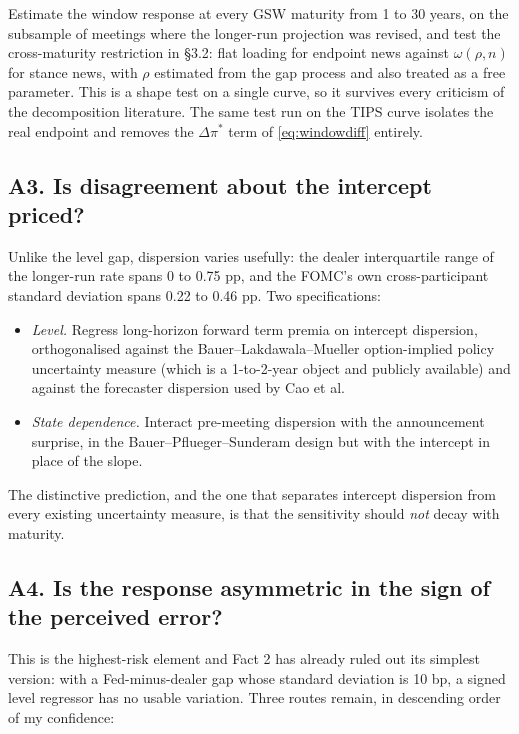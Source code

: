 \documentclass[11pt]{article}
\begin{document}
Estimate the window response at every GSW maturity from 1 to 30 years, on the subsample of
meetings where the longer-run projection was revised, and test the cross-maturity restriction
in \S3.2: flat loading for endpoint news against $\omega(\rho,n)$ for stance news, with $\rho$
estimated from the gap process and also treated as a free parameter. This is a shape test on
a single curve, so it survives every criticism of the decomposition literature. The same test
run on the TIPS curve isolates the real endpoint and removes the $\Delta\pi^{*}$ term of
\eqref{eq:windowdiff} entirely.

\subsection{A3. Is disagreement about the intercept priced?}

Unlike the level gap, dispersion varies usefully: the dealer interquartile range of the
longer-run rate spans 0 to 0.75 pp, and the FOMC's own cross-participant standard deviation
spans 0.22 to 0.46 pp. Two specifications:

\begin{itemize}\setlength\itemsep{0.1em}
\item \emph{Level.} Regress long-horizon forward term premia on intercept dispersion,
orthogonalised against the Bauer--Lakdawala--Mueller option-implied policy uncertainty measure
(which is a 1-to-2-year object and publicly available) and against the forecaster dispersion
used by Cao et al.
\item \emph{State dependence.} Interact pre-meeting dispersion with the announcement surprise,
in the Bauer--Pflueger--Sunderam design but with the intercept in place of the slope.
\end{itemize}

The distinctive prediction, and the one that separates intercept dispersion from every existing
uncertainty measure, is that the sensitivity should \emph{not} decay with maturity.

\subsection{A4. Is the response asymmetric in the sign of the perceived error?}

This is the highest-risk element and Fact 2 has already ruled out its simplest version: with a
Fed-minus-dealer gap whose standard deviation is 10 bp, a signed level regressor has no usable
variation. Three routes remain, in descending order of my confidence:
\end{document}
